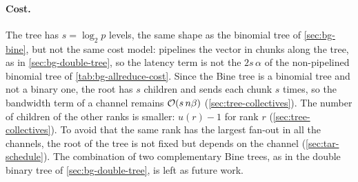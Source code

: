 \paragraph{Cost.}
The tree has $s=\log_2p$ levels, the same shape as the binomial tree of \cref{sec:bg-bine}, but not the same cost model: \nccl{} pipelines the vector in chunks along the tree, as in \cref{sec:bg-double-tree}, so the latency term is not the $2s\,\alpha$ of the non-pipelined binomial tree of \cref{tab:bg-allreduce-cost}.
Since the Bine tree is a binomial tree and not a binary one, the root has $s$ children and sends each chunk $s$ times, so the bandwidth term of a channel remains $\mathcal{O}\!\left(s\,n\beta\right)$ (\cref{sec:tree-collectives}).
The number of children of the other ranks is smaller: $u(r)-1$ for rank $r$ (\cref{sec:tree-collectives}).
To avoid that the same rank has the largest fan-out in all the channels, the root of the tree is not fixed but depends on the channel (\cref{sec:tar-schedule}).
The combination of two complementary Bine trees, as in the double binary tree of \cref{sec:bg-double-tree}, is left as future work.
